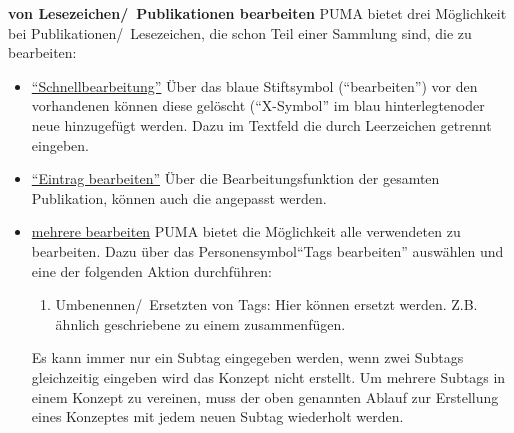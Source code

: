 \textbf{\tags von Lesezeichen/~Publikationen bearbeiten} \newline
PUMA bietet drei Möglichkeit bei Publikationen/~Lesezeichen, die schon Teil einer Sammlung sind, die \tags zu bearbeiten: 
\begin{itemize}
    \item \underline{\enquote{Schnellbearbeitung}}\newline
   Über das blaue Stiftsymbol (\enquote{\tags bearbeiten}) vor den vorhandenen \tags können diese gelöscht (\enquote{X-Symbol} im blau hinterlegten\tag oder neue hinzugefügt werden. Dazu im Textfeld die \tags durch Leerzeichen getrennt eingeben.
    \item \underline{\enquote{Eintrag bearbeiten}}\newline
    Über die Bearbeitungsfunktion der gesamten Publikation, können auch die \tags angepasst werden. 
    \item \underline{mehrere \tags bearbeiten}\newline
    PUMA bietet die Möglichkeit alle verwendeten \tags zu bearbeiten. Dazu über das Personensymbol\enquote{Tags bearbeiten} auswählen und eine der folgenden Aktion durchführen:
    \begin{enumerate}
        \item Umbenennen/~Ersetzten von Tags: \newline Hier können \tags ersetzt werden. Z.B. ähnlich geschriebene \tags zu einem \tag zusammenfügen.
    \end{enumerate}
		\begin{tip} Es kann immer nur ein Subtag eingegeben werden, wenn zwei Subtags gleichzeitig eingeben wird das Konzept nicht erstellt. Um mehrere Subtags in einem Konzept zu vereinen, muss der oben genannten Ablauf zur Erstellung eines Konzeptes mit jedem neuen Subtag wiederholt werden.
		\end{tip}
\end{itemize}


